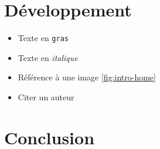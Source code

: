 \documentclass[a4paper, 12pt, oneside]{book}
\begin{document}
\chapter{Développement} 
\begin{itemize}
  \item Texte en \texttt{gras}
  \item Texte en \textit{italique}
  \item Référence à une image \ref{fig:intro-home}
  \item Citer un auteur \cite{tourism}
\end{itemize}

\chapter{Conclusion}



\end{document}
